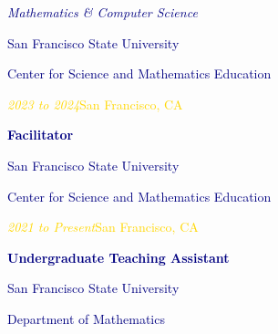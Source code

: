 \documentclass[hidelinks, 10pt]{article}
\begin{document}
\begin{textblock}{4}
    \scriptsize\textcolor{navy}{\scriptsize\emph{Mathematics \& Computer Science}}

    \vspace{0.5mm}

    \footnotesize\textcolor{navy}{\scriptsize San Francisco State University}

    \vspace{0.5mm}

    \scriptsize\textcolor{navy}{\scriptsize Center for Science and Mathematics Education}

    \vspace{0.5mm}

    \scriptsize\textcolor{gold}{\scriptsize\emph{2023 to 2024}\hfill San
        Francisco, CA}


    \vspace{2mm}

    \footnotesize\textcolor{navy}{\scriptsize\textbf{Facilitator}}

    \vspace{0.5mm}

    \footnotesize\textcolor{navy}{\scriptsize San Francisco State University}

    \vspace{0.5mm}

    \scriptsize\textcolor{navy}{\scriptsize Center for Science and Mathematics Education}

    \vspace{0.5mm}

    \scriptsize\textcolor{gold}{\scriptsize\emph{2021 to Present}\hfill San
        Francisco, CA}

    \vspace{2mm}

    \footnotesize\textcolor{navy}{\scriptsize\textbf{Undergraduate Teaching Assistant}}

    \vspace{0.5mm}

    \footnotesize\textcolor{navy}{\scriptsize San Francisco State University}

    \vspace{0.5mm}

    \scriptsize\textcolor{navy}{\scriptsize Department of Mathematics}

    \vspace{0.5mm}


\end{textblock}
\end{document}
